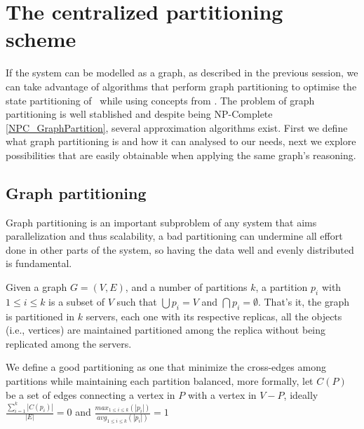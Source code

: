 \section{The centralized partitioning scheme}



If the system can be modelled as a graph, as described in the previous session, we can take advantage of algorithms that perform graph partitioning to optimise the state partitioning of \ssmr\  while using concepts from \dssmr. The problem of graph partitioning is well stablished and despite being NP-Complete \ref{NPC_GraphPartition}, several approximation algorithms exist. First we define what graph partitioning is and how it can analysed to our needs, next we explore possibilities that are easily obtainable when applying the same graph's reasoning.

\subsection{Graph partitioning}
Graph partitioning is an important subproblem of any system that aims parallelization and thus scalability, a bad partitioning can undermine all effort done in other parts of the system, so having the data well and evenly distributed is fundamental.



Given a graph $G = (V, E)$, and a number of partitions $k$, a partition $p_i$ with $1 \leq i \leq k$ is a subset of $V$ such that $\bigcup p_i = V$ and $\bigcap p_i = \emptyset$. That's it, the graph is partitioned in $k$ servers, each one with its respective replicas, all the objects (i.e., vertices) are maintained partitioned among the replica without being replicated among the servers.

We define a good partitioning as one that minimize the cross-edges among partitions while maintaining each partition balanced, more formally, let $C(P)$ be a set of edges connecting a vertex in $P$ with a vertex in $V - P$, ideally $\frac{\sum_{i=1}^{k}|C(p_i)|}{|E|} = 0$ and $\frac{max_{1 \leq i \leq k}(|p_i|)}{avg_{1 \leq i \leq k}(|p_i|)} = 1$



